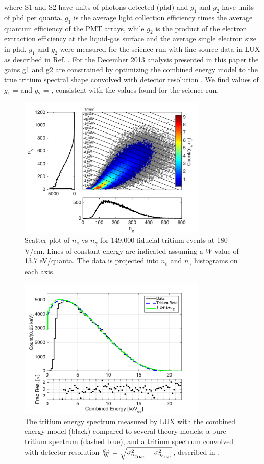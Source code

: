 \noindent
where S1 and S2 have units of photons detected (phd) and $g_1$ and $g_2$ have units of phd per quanta. $g_1$ is the average light collection efficiency times the average quantum efficiency of the PMT arrays, while $g_2$ is the product of the electron extraction efficiency at the liquid-gas surface and the average single electron size in phd. $g_1$ and $g_2$ were measured for the science run with line source data in LUX as described in Ref. \cite{lux-reanalysis, lux-prd}. For the December 2013 analysis presented in this paper the gains g1 and g2 are constrained by optimizing the combined energy model to the true tritium spectral shape \cite{Tritium_Eq_Simpson} convolved with detector resolution \cite{Dobi_Thesis}. We find values of $g_1$ = \gone and  $g_2$ = \gtwo, consistent with the values found for the science run.

\begin{figure}[h!]\centering
\includegraphics[width=90mm]{fig/tritium_scatter.png}
\caption{Scatter plot of $n_e$ vs $n_{\gamma}$ for 149,000 fiducial tritium events at 180 V/cm. Lines of constant energy are indicated assuming a $W$ value of 13.7 eV/quanta. The data is projected into $n_e$ and $n_{\gamma}$ histograms on each axis.}
\label{fig:tritium-scatter}
\end{figure}


\begin{figure}[h!]
\begin{center}
\includegraphics[width=90mm]{fig/tritium-spectrum-linear.png}
\caption{The tritium energy spectrum measured by LUX with the combined energy model (black) compared to several theory models: a pure tritium spectrum (dashed blue), and a tritium spectrum convolved with detector resolution $\rm \frac{\sigma_E}{W} = \sqrt{\sigma_{n_{\gamma_{Det}}}^2 + \sigma_{n_{e_{Det}}}^2}$, described in \cite{Dobi_Thesis}. }
\label{fig:tritium-spectrum}
\end{center}
\end{figure}

